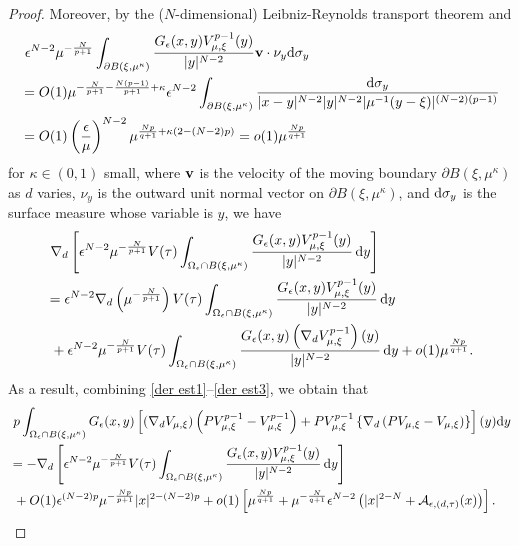 \documentclass[reqno]{amsart}
\theoremstyle{remark}
\newcommand{\pa}{\partial}
\newcommand{\ep}{\epsilon}
\newcommand{\mca}{\mathcal{A}}
\newcommand{\dy}{\textup{d}y}
\newcommand{\mx}{{\mu,\xi}}
\renewcommand{\(}{\left(}
\renewcommand{\)}{\right)}
\numberwithin{equation}{section}
\begin{document}
\begin{proof}
Moreover, by the ($N$-dimensional) Leibniz-Reynolds transport theorem and
\begin{align*}
&\ \ep^{N-2}\mu^{-\frac{N}{p+1}} \int_{\pa B(\xi,\mu^\kappa)}\frac{G_\ep(x,y)V_\mx^{p-1}(y)}{|y|^{N-2}} {\bf v} \cdot \nu_y \textup{d}\sigma_y\\
&= O(1)\mu^{-\frac{N}{p+1}-\frac{N(p-1)}{p+1}+\kappa} \ep^{N-2}\int_{\pa B(\xi,\mu^\kappa)} \frac{\textup{d}\sigma_y}{|x-y|^{N-2}|y|^{N-2}|\mu^{-1}(y-\xi)|^{(N-2)(p-1)}}\\
&= O(1)\(\frac{\ep}{\mu}\)^{N-2}\mu^{\frac{Np}{q+1}+\kappa(2-(N-2)p)}=o(1)\mu^{\frac{Np}{q+1}}
\end{align*}
for $\kappa \in (0,1)$ small, where ${\bf v}$ is the velocity of the moving boundary $\pa B(\xi,\mu^\kappa)$ as $d$ varies,
$\nu_y$ is the outward unit normal vector on $\pa B(\xi,\mu^\kappa)$, and $\textup{d}\sigma_y$ is the surface measure whose variable is $y$, we have
\begin{equation}\label{der est3}
\begin{aligned}
&\ \nabla_d \left[\ep^{N-2}\mu^{-\frac{N}{p+1}} V(\tau) \int_{\Omega_\ep \cap B(\xi,\mu^\kappa)} \frac{G_\ep(x,y)V_\mx^{p-1}(y)}{|y|^{N-2}}\, \dy\right]\\
&= \ep^{N-2}\nabla_d\(\mu^{-\frac{N}{p+1}}\) V(\tau) \int_{\Omega_\ep \cap B(\xi,\mu^\kappa)} \frac{G_\ep(x,y)V_\mx^{p-1}(y)}{|y|^{N-2}}\, \dy \\
&\ +\ep^{N-2}\mu^{-\frac{N}{p+1}} V(\tau) \int_{\Omega_\ep \cap B(\xi,\mu^\kappa)}\frac{G_\ep(x,y)\(\nabla_d V_\mx^{p-1}\)(y)}{|y|^{N-2}}\, \dy+o(1)\mu^{\frac{Np}{q+1}}.
\end{aligned}
\end{equation}
As a result, combining \eqref{der est1}--\eqref{der est3}, we obtain that
\begin{equation}\label{inner c1}
\begin{aligned}
&\ p\int_{\Omega_\ep \cap B(\xi,\mu^\kappa)} G_\ep(x,y) \left[\(\nabla_d V_\mx\) \(PV_\mx^{p-1}-V_\mx^{p-1}\) + PV_\mx^{p-1} \left\{\nabla_d\(PV_\mx-V_\mx\)\right\}\right](y)\dy \\
&= -\nabla_d \left[\ep^{N-2}\mu^{-\frac{N}{p+1}} V(\tau) \int_{\Omega_\ep \cap B(\xi,\mu^\kappa)} \frac{G_\ep(x,y)V_\mx^{p-1}(y)}{|y|^{N-2}}\, \dy\right] \\
&\ + O(1) \ep^{(N-2)p}\mu^{-\frac{Np}{p+1}} |x|^{2-(N-2)p} + o(1)\left[\mu^{\frac{Np}{q+1}} + \mu^{-\frac{N}{q+1}}\ep^{N-2} \(|x|^{2-N}+\mca_{\ep,(d,\tau)}(x)\)\right].
\end{aligned}
\end{equation}


\end{proof}
\end{document}
